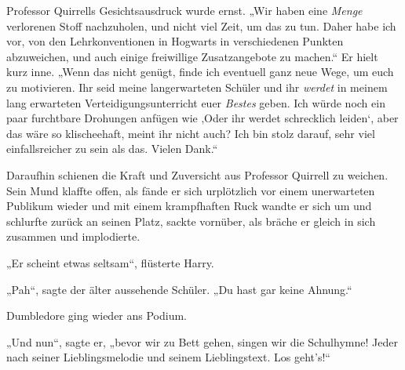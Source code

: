 Professor Quirrells Gesichtsausdruck wurde ernst. „Wir haben eine \emph{Menge} verlorenen Stoff nachzuholen, und nicht viel Zeit, um das zu tun. Daher habe ich vor, von den Lehrkonventionen in Hogwarts in verschiedenen Punkten abzuweichen, und auch einige freiwillige Zusatzangebote zu machen.“ Er hielt kurz inne. „Wenn das nicht genügt, finde ich eventuell ganz neue Wege, um euch zu motivieren. Ihr seid meine langerwarteten Schüler und ihr \emph{werdet} in meinem lang erwarteten Verteidigungsunterricht euer \emph{Bestes} geben. Ich würde noch ein paar furchtbare Drohungen anfügen wie ‚Oder ihr werdet schrecklich leiden‘, aber das wäre so klischeehaft, meint ihr nicht auch? Ich bin stolz darauf, sehr viel einfallsreicher zu sein als das. Vielen Dank.“

Daraufhin schienen die Kraft und Zuversicht aus Professor Quirrell zu weichen. Sein Mund klaffte offen, als fände er sich urplötzlich vor einem unerwarteten Publikum wieder und mit einem krampfhaften Ruck wandte er sich um und schlurfte zurück an seinen Platz, sackte vornüber, als bräche er gleich in sich zusammen und implodierte.

„Er scheint etwas seltsam“, flüsterte Harry.

„Pah“, sagte der älter aussehende Schüler. „Du hast gar keine Ahnung.“

Dumbledore ging wieder ans Podium.

„Und nun“, sagte er, „bevor wir zu Bett gehen, singen wir die Schulhymne! Jeder nach seiner Lieblingsmelodie und seinem Lieblingstext. Los geht’s!“

